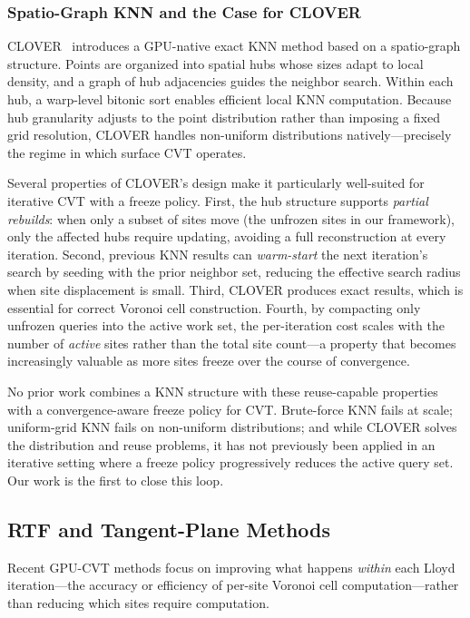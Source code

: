 \subsubsection{Spatio-Graph KNN and the Case for CLOVER}

CLOVER~\cite{kamel2025clover} introduces a GPU-native exact KNN method based on a spatio-graph structure. Points are organized into spatial hubs whose sizes adapt to local density, and a graph of hub adjacencies guides the neighbor search. Within each hub, a warp-level bitonic sort enables efficient local KNN computation. Because hub granularity adjusts to the point distribution rather than imposing a fixed grid resolution, CLOVER handles non-uniform distributions natively---precisely the regime in which surface CVT operates.

Several properties of CLOVER's design make it particularly well-suited for iterative CVT with a freeze policy. First, the hub structure supports \emph{partial rebuilds}: when only a subset of sites move (the unfrozen sites in our framework), only the affected hubs require updating, avoiding a full reconstruction at every iteration. Second, previous KNN results can \emph{warm-start} the next iteration's search by seeding with the prior neighbor set, reducing the effective search radius when site displacement is small. Third, CLOVER produces exact results, which is essential for correct Voronoi cell construction. Fourth, by compacting only unfrozen queries into the active work set, the per-iteration cost scales with the number of \emph{active} sites rather than the total site count---a property that becomes increasingly valuable as more sites freeze over the course of convergence.

No prior work combines a KNN structure with these reuse-capable properties with a convergence-aware freeze policy for CVT. Brute-force KNN fails at scale; uniform-grid KNN fails on non-uniform distributions; and while CLOVER solves the distribution and reuse problems, it has not previously been applied in an iterative setting where a freeze policy progressively reduces the active query set. Our work is the first to close this loop.

\subsection{RTF and Tangent-Plane Methods}

Recent GPU-CVT methods focus on improving what happens \emph{within} each Lloyd iteration---the accuracy or efficiency of per-site Voronoi cell computation---rather than reducing which sites require computation.

